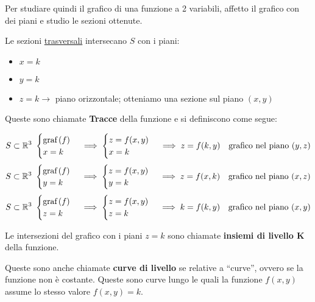 Per studiare quindi il grafico di una funzione a 2 variabili, affetto il grafico con dei piani e studio le sezioni ottenute.

Le sezioni \underline{trasversali} intersecano \(S\) con i piani:
\begin{itemize}
    \item \(x=k\)
    \item \(y=k\)
    \item \(z=k \rightarrow \) piano orizzontale; otteniamo una sezione sul piano \((x,y)\)
\end{itemize}

Queste sono chiamate \textbf{Tracce} della funzione e si definiscono come segue:

\[
    S \subset \mathbb{R}^3\
    \begin{cases}
        \text{graf}\left(f\right) \\
        x=k
    \end{cases}
    \implies
    \begin{cases}
        z = f(x,y) \\
        x=k
    \end{cases}
    \implies
    z = f(k,y) \quad \text{grafico nel piano }(y,z)
\]
\[
    S \subset \mathbb{R}^3\
    \begin{cases}
        \text{graf}\left(f\right) \\
        y=k
    \end{cases}
    \implies
    \begin{cases}
        z = f(x,y) \\
        y=k
    \end{cases}
    \implies
    z = f(x,k) \quad \text{grafico nel piano }(x,z)
\]
\[
    S \subset \mathbb{R}^3\
    \begin{cases}
        \text{graf}\left(f\right) \\
        z=k
    \end{cases}
    \implies
    \begin{cases}
        z = f(x,y) \\
        z=k
    \end{cases}
    \implies
    k = f(k,y) \quad \text{grafico nel piano }(x,y)
\]

Le intersezioni del grafico con i piani \(z=k\) sono chiamate \textbf{insiemi di livello K} della funzione.

Queste sono anche chiamate \textbf{curve di livello} se relative a ``curve'', ovvero se la funzione non è costante. Queste sono curve lungo le quali la funzione \(f(x,y)\) assume lo stesso valore \(f(x,y) = k\).


